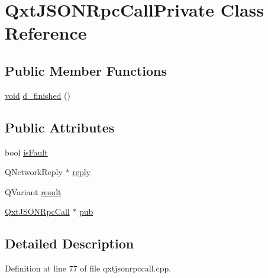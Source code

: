 \hypertarget{class_qxt_j_s_o_n_rpc_call_private}{\section{Qxt\-J\-S\-O\-N\-Rpc\-Call\-Private Class Reference}
\label{class_qxt_j_s_o_n_rpc_call_private}
}
\subsection*{Public Member Functions}
\begin{DoxyCompactItemize}
\item 
\hyperlink{group___u_a_v_objects_plugin_ga444cf2ff3f0ecbe028adce838d373f5c}{void} \hyperlink{class_qxt_j_s_o_n_rpc_call_private_ab3b23eb390fab4b67e56b8dd10bdbc7b}{d\-\_\-finished} ()
\end{DoxyCompactItemize}
\subsection*{Public Attributes}
\begin{DoxyCompactItemize}
\item 
bool \hyperlink{class_qxt_j_s_o_n_rpc_call_private_ab2d6d9c3466a9c84b6b679dbf026136a}{is\-Fault}
\item 
Q\-Network\-Reply $\ast$ \hyperlink{class_qxt_j_s_o_n_rpc_call_private_a44b06611f3109a71610097ca750e48e1}{reply}
\item 
Q\-Variant \hyperlink{class_qxt_j_s_o_n_rpc_call_private_ac70e863bcf0d9947653d8abca106b668}{result}
\item 
\hyperlink{class_qxt_j_s_o_n_rpc_call}{Qxt\-J\-S\-O\-N\-Rpc\-Call} $\ast$ \hyperlink{class_qxt_j_s_o_n_rpc_call_private_a42cd231545b7818602fa82a5e8c1c7fd}{pub}
\end{DoxyCompactItemize}


\subsection{Detailed Description}


Definition at line 77 of file qxtjsonrpccall.\-cpp.



